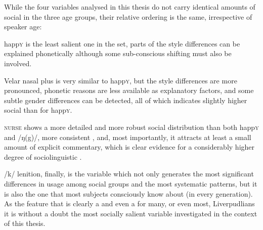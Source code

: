 While the four variables analysed in this thesis do not carry identical amounts of social  in the three age groups, their relative ordering is the same, irrespective of speaker age:
\begin{inparaenum}[(1)]
	\item happ\textsc{y} is the least salient one in the set, parts of the style differences can be explained phonetically although some sub-conscious shifting must also be involved.
	\item Velar nasal plus is very similar to happ\textsc{y}, but the style differences are more pronounced, phonetic reasons are less available as explanatory factors, and some subtle gender differences can be detected, all of which indicates slightly higher social  than for happ\textsc{y}.
	\item \textsc{nurse} shows a more detailed and more robust social distribution than both happ\textsc{y} and /ŋ(g)/, more consistent , and, most importantly, it attracts at least a small amount of explicit commentary, which is clear evidence for a considerably higher degree of sociolinguistic .
	\item /k/ lenition, finally, is the variable which not only generates the most significant differences in usage among social groups and the most systematic  patterns, but it is also the one that most subjects consciously know about (in every generation).
	As the feature that is clearly a  and even a  for many, or even most, Liverpudlians it is without a doubt the most socially salient variable investigated in the context of this thesis.
\end{inparaenum}